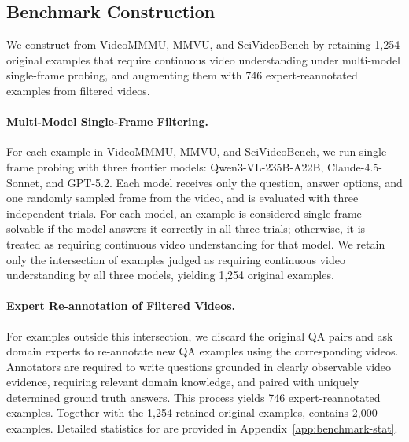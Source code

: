 \subsection{\eval Benchmark Construction}
We construct \textbf{\eval} from VideoMMMU, MMVU, and SciVideoBench by retaining 1,254 original examples that require continuous video understanding under multi-model single-frame probing, and augmenting them with 746 expert-reannotated examples from filtered videos.

\vspace{-8pt}
\paragraph{Multi-Model Single-Frame Filtering.}
For each example in VideoMMMU, MMVU, and SciVideoBench, we run single-frame probing with three frontier models: Qwen3-VL-235B-A22B, Claude-4.5-Sonnet, and GPT-5.2. Each model receives only the question, answer options, and one randomly sampled frame from the video, and is evaluated with three independent trials. For each model, an example is considered single-frame-solvable if the model answers it correctly in all three trials; otherwise, it is treated as requiring continuous video understanding for that model. We retain only the intersection of examples judged as requiring continuous video understanding by all three models, yielding 1,254 original examples.
\vspace{-8pt}
\paragraph{Expert Re-annotation of Filtered Videos.}
For examples outside this intersection, we discard the original QA pairs and ask domain experts to re-annotate new QA examples using the corresponding videos. Annotators are required to write questions grounded in clearly observable video evidence, requiring relevant domain knowledge, and paired with uniquely determined ground truth answers. This process yields 746 expert-reannotated examples. Together with the 1,254 retained original examples, \eval contains 2,000 examples.
Detailed statistics for \eval are provided in Appendix~\ref{app:benchmark-stat}.
